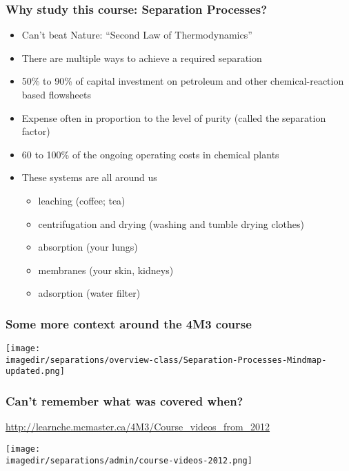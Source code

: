 \begin{frame}\frametitle{Why study this course: Separation Processes?}
	\begin{itemize}
		\item	Can't beat Nature: ``Second Law of Thermodynamics''
		\item	There are multiple ways to achieve a required separation
		\item	50\% to 90\% of capital investment on petroleum and other chemical-reaction based flowsheets 
		\item	Expense often in proportion to the level of purity (called the separation factor) %
		\item	60 to 100\% of the ongoing operating costs in chemical plants  %
		\item	These systems are all around us
		\begin{itemize}
			\item	leaching (coffee; tea)
			\item	centrifugation and drying (washing and tumble drying clothes)
			\item	absorption (your lungs)
			\item	membranes (your skin, kidneys)
			\item	adsorption (water filter)
		\end{itemize}
	\end{itemize}
\end{frame}

\begin{frame}\frametitle{Some more context around the 4M3 course}
	\begin{center}
		\texttt{[image: \\imagedir/separations/overview-class/Separation-Processes-Mindmap-updated.png]}
	\end{center}
\end{frame}

\begin{frame}\frametitle{Can't remember what was covered when?}
	\begin{exampleblock}{}
		\href{http://learnche.mcmaster.ca/4M3/Course\_videos\_from\_2012}{http://learnche.mcmaster.ca/4M3/Course\_videos\_from\_2012}
	\end{exampleblock}
	\begin{center}
		\texttt{[image: \\imagedir/separations/admin/course-videos-2012.png]}
	\end{center}
\end{frame}

